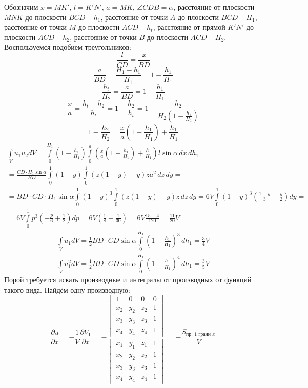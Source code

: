 Обозначим $x = MK'$, $l = K'N'$, $a = MK$, $\angle CDB = \alpha$, расстояние от плоскости $MNK$ до плоскости $BCD$ -- $h_1$, расстояние от точки $A$ до плоскости $BCD$ -- $H_1$, расстояние от точки $M$ до плоскости $ACD$ -- $h_t$, расстояние от прямой $K'N'$ до плоскости $ACD$ -- $h_2$, расстояние от точки $B$ до плоскости $ACD$ -- $H_2$. Воспользуемся подобием треугольников:
\[
	\frac{l}{CD} = \frac{x}{BD}
\]
\[
	\frac{a}{BD} = \frac{H_1 - h_1}{H_1} = 1 - \frac{h_1}{H_1}
\]
\[
	\frac{h_t}{H_2} = \frac{a}{BD} = 1 - \frac{h_1}{H_1}
\]
\[
	\frac{x}{a} = \frac{h_t - h_2}{h_t} = 1 - \frac{h_2}{h_t} =
	1 - \frac{h_2}{H_2\left(1 - \frac{h_1}{H_1}\right)}
\]
\[
	1 - \frac{h_2}{H_2} = \frac{x}{a} \left(1 - \frac{h_1}{H_1}\right) + \frac{h_1}{H_1}
\]
\[
	\boxed{
	\begin{gathered}
	\int\limits_V u_1 u_2 dV = 
	\int\limits_{0}^{H_1} \left(1 - \frac{h_1}{H_1}\right) \int\limits_{0}^{a}  \left(\frac{x}{a} \left(1 - \frac{h_1}{H_1}\right) + \frac{h_1}{H_1}\right) l \sin \alpha \, dx \, dh_1 
	= \\ =
	\frac{CD\cdot H_1 \sin \alpha}{BD}
	\int\limits_{0}^{1} (1 - y) \int\limits_{0}^{1}  \left(z \left(1 - y\right) + y\right) z a^2 \, dz \, dy
	= \\ =
	BD\cdot CD\cdot H_1 \sin \alpha
	\int\limits_{0}^{1} (1 - y)^3 \int\limits_{0}^{1}  \left(z \left(1 - y\right) + y\right) z \, dz \, dy
	= 
	6 V
	\int\limits_{0}^{1} (1 - y)^3 \left(\frac{1 - y}{3} + \frac{y}{2}\right) dy
	= \\ =
	6 V
	\int\limits_{0}^{1} p^3 \left(- \frac{p}{6} + \frac{1}{2}\right) dp
	=
	6 V \left(\frac{1}{8} - \frac{1}{30}\right) = 6 V \frac{15 - 4}{120} = \frac{11}{20} V
	\end{gathered}
	}
\]
\[
\boxed{
	\begin{gathered}
	\int\limits_V u_1 dV = 
	\frac{1}{2} BD\cdot CD \sin \alpha \int\limits_{0}^{H_1} \left(1 - \frac{h_1}{H_1}\right)^3 \, dh_1 
	= 
	\frac{3}{4} V
	\end{gathered}
}
\]
\[
\boxed{
	\begin{gathered}
	\int\limits_V u_1^2 dV = 
	\frac{1}{2} BD\cdot CD \sin \alpha \int\limits_{0}^{H_1} \left(1 - \frac{h_1}{H_1}\right)^4 \, dh_1 
	= 
	\frac{3}{5} V
	\end{gathered}
}
\]
Порой требуется искать производные и интегралы от производных от функций такого вида. Найдём одну производную:
\[
	\frac{\partial u}{\partial x} = - \frac{1}{V} \frac{\partial V_1}{\partial x}
	=
	- \frac{\begin{vmatrix}
	1   & 0   & 0   & 0 \\
	x_2 & y_2 & z_2 & 1 \\
	x_3 & y_3 & z_3 & 1 \\
	x_4 & y_4 & z_4 & 1
	\end{vmatrix}}{\begin{vmatrix}
	x_1 & y_1 & z_1 & 1 \\
	x_2 & y_2 & z_2 & 1 \\
	x_3 & y_3 & z_3 & 1 \\
	x_4 & y_4 & z_4 & 1
	\end{vmatrix}}
	=
	- \frac{S_{\text{пр. 1 грани }x}}{V}
\]